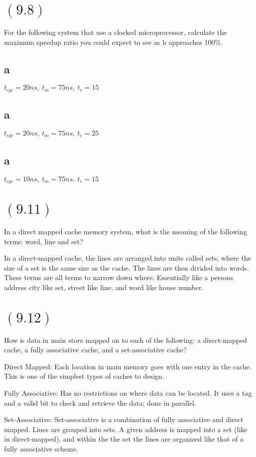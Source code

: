\documentclass[letterpaper,12pt,titlepage]{article}
\begin{document}
\section*{$(9.8)$} For the following system that use a clocked microprocessor, calculate the maximum speedup ratio you could expect to see as h approaches 100\%.
\begin{mdframed}[style=MyFrame]
\subsection*{a} $t_{cyc}=20ns,~t_m=75ns,~t_c=15$
\subsection*{a} $t_{cyc}=20ns,~t_m=75ns,~t_c=25$
\subsection*{a} $t_{cyc}=10ns,~t_m=75ns,~t_c=15$
\end{mdframed}

\section*{$(9.11)$} In a direct mapped cache memory system, what is the meaning of the following terms: word, line and set?

\begin{mdframed}[style=MyFrame]
In a direct-mapped cache, the lines are arranged into units called sets, where the size of a set is the same size as the cache. The lines are then divided into words. These terms are all terms to narrow down where. Essentially like a persons address city like set, street like line, and word like house number. 
\end{mdframed}

\section*{$(9.12)$} How is data in main store mapped on to each of the following: a direct-mapped cache, a fully associative cache, and a set-associative cache? 

\begin{mdframed}[style=MyFrame]



Direct Mapped: Each location in main memory goes with one entry in the cache. This is one of the simplest types of caches to design.


Fully Associative: Has no restrictions on where data can be located. It uses a tag and a valid bit to check and retrieve the data; done in parallel. 

Set-Associative: Set-associative is a combination of fully associative and direct mapped. Lines are grouped into sets. A given address is mapped into a set (like in direct-mapped), and within the the set the lines are organized like that of a fully associative scheme. 

\end{mdframed}
\newpage
\end{document}
